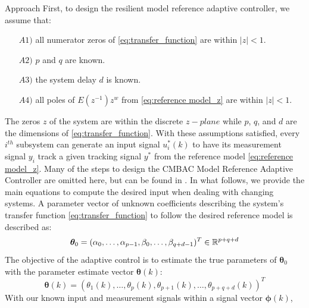 \begin{section}{Approach}
First, to design the resilient model reference adaptive controller, we assume that:
	\begin{enumerate}%
	\item[$A1)$] all numerator zeros of \eqref{eq:transfer_function} are within $|z|<1$.
	\item[$A2)$] $p$ and $q$ are known. 
	\item[$A3)$] the system delay $d$ is known.
	\item[$A4)$] all poles of $E(z^{-1})z^w$ from \eqref{eq:reference model_z} are within $|z|<1$.
	\end{enumerate}
The zeros $z$ of the system are within the discrete $z-plane$ while $p$, $q$, and $d$ are the dimensions of \eqref{eq:transfer_function}. With these assumptions satisfied, every $i^{th}$ subsystem can generate an input signal $u^*_i(k)$ to have its measurement signal $y_i$ track a given tracking signal $y^*$ from the reference model \eqref{eq:reference model_z}. Many of the steps to design the CMBAC Model Reference Adaptive Controller are omitted here, but can be found in \cite{tao2003adaptive,Goodwin1643720}. In what follows, we provide the main equations to compute the desired input when dealing with changing systems. A parameter vector of unknown coefficients describing the system's transfer function \eqref{eq:transfer_function} to follow the desired reference model is described as:
    \begin{equation}
	\bm{\theta}_0=(\alpha_0, \dots ,\alpha_{p-1},\beta_0, \dots ,\beta_{q+d-1})^T \in \mathbb{R}^{p+q+d}
	\end{equation}
The objective of the adaptive control is to estimate the true parameters of $\bm{\theta}_0$ with the parameter estimate vector $\bm{\theta}(k)$:
    \begin{equation}
    \bm{\theta}(k)=(\theta_1(k), \dots ,\theta_p(k),\theta_{p+1}(k), \dots ,\theta_{p+q+d}(k))^T
	\end{equation}
With our known input and measurement signals within a signal vector $\bm{\phi}(k)$,
    

\end{section}
